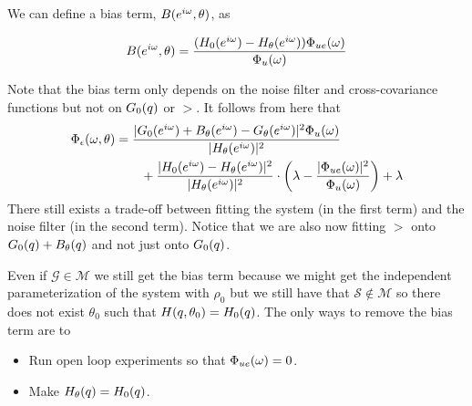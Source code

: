 We can define a bias term, $B(e^{i\omega},\theta)$, as

\begin{equation*}
B(e^{i\omega},\theta) = \frac{(H_0(e^{i\omega})-H_\theta(e^{i\omega}))\Phi_{ue}(\omega)}{\Phi_u(\omega)}
\end{equation*}

Note that the bias term only depends on the noise filter and cross-covariance functions but not on $G_0(q)$ or $\gt$.
It follows from here that
\begin{align*}
\Phi_\epsilon(\omega,\theta) &= \frac{|G_0(e^{i\omega})+B_\theta(e^{i\omega})-G_\theta(e^{i\omega})|^2\Phi_u(\omega)}{|H_\theta(e^{i\omega})|^2} \\
&\qquad + \frac{|H_0(e^{i\omega})-H_\theta(e^{i\omega})|^2}{|H_\theta(e^{i\omega})|^2}\cdot \left(\lambda-\frac{|\Phi_{ue}(\omega)|^2}{\Phi_u(\omega)}\right) + \lambda
\end{align*}
There still exists a trade-off between fitting the system (in the first term) and the noise filter (in the second term).
Notice that we are also now fitting $\gt$ onto $G_0(q)+B_\theta(q)$ and not just onto $G_0(q)$.

Even if $\mathcal{G}\in\mathcal{M}$ we still get the bias term because we might get the independent parameterization of the system with $\rho_0$ but we still have that $\mathcal{S}\notin\mathcal{M}$ so there does not exist $\theta_0$ such that $H(q,\theta_0)=H_0(q)$.
The only ways to remove the bias term are to
\begin{itemize}
\item Run open loop experiments so that $\Phi_{ue}(\omega)=0$.
\item Make $H_\theta(q)=H_0(q)$.
\end{itemize}
